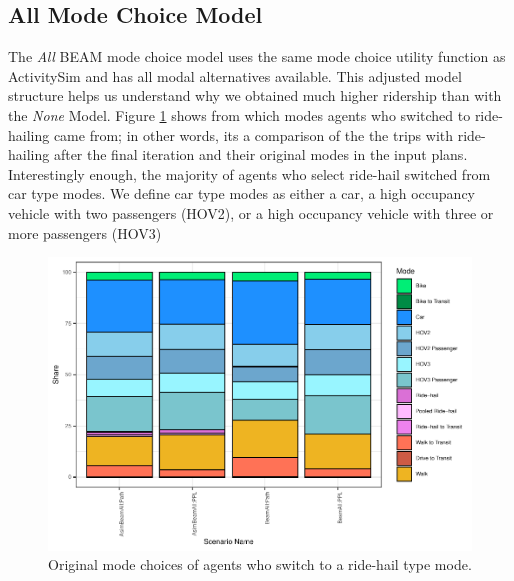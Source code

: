 \documentclass[fancy, masters]{byuthesis}
\begin{document}
\hypertarget{type3}{%
\subsection{All Mode Choice Model}\label{type3}}

The \emph{All} BEAM mode choice model uses the same mode choice utility function as ActivitySim and has all modal alternatives available. This adjusted model structure helps us understand why we obtained much higher ridership than with the \emph{None} Model. Figure \ref{fig:piechart} shows from which modes agents who switched to ride-hailing came from; in other words, its a comparison of the the trips with ride-hailing after the final iteration and their original modes in the input plans. Interestingly enough, the majority of agents who select ride-hail switched from car type modes. We define car type modes as either a car, a high occupancy vehicle with two passengers (HOV2), or a high occupancy vehicle with three or more passengers (HOV3)

\begin{figure}

{\centering \includegraphics{thesis_files/figure-latex/piechart-1} 

}

\caption[Original mode choices of agents who switch to ride-hail.]{Original mode choices of agents who switch to a ride-hail type mode.}\label{fig:piechart}
\end{figure}
\end{document}
